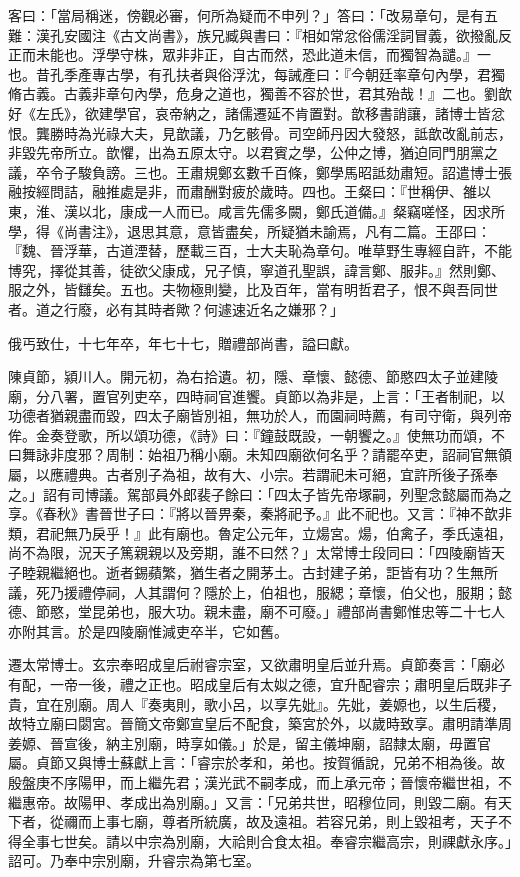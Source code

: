 \begin{pinyinscope}
 客曰：「當局稱迷，傍觀必審，何所為疑而不申列？」答曰：「改易章句，是有五難：漢孔安國注《古文尚書》，族兄臧與書曰：『相如常忿俗儒淫詞冒義，欲撥亂反正而未能也。浮學守株，眾非非正，自古而然，恐此道未信，而獨智為譴。』一也。昔孔季產專古學，有孔扶者與俗浮沈，每誡產曰：『今朝廷率章句內學，君獨脩古義。古義非章句內學，危身之道也，獨善不容於世，君其殆哉！』二也。劉歆好《左氏》，欲建學官，哀帝納之，諸儒遷延不肯置對。歆移書誚讓，諸博士皆忿恨。龔勝時為光祿大夫，見歆議，乃乞骸骨。司空師丹因大發怒，詆歆改亂前志，非毀先帝所立。歆懼，出為五原太守。以君賓之學，公仲之博，猶迫同門朋黨之議，卒令子駿負謗。三也。王肅規鄭玄數千百條，鄭學馬昭詆劾肅短。詔遣博士張融按經問詰，融推處是非，而肅酬對疲於歲時。四也。王粲曰：『世稱伊、雒以東，淮、漢以北，康成一人而已。咸言先儒多闕，鄭氏道備。』粲竊嗟怪，因求所學，得《尚書注》，退思其意，意皆盡矣，所疑猶未諭焉，凡有二篇。王邵曰：『魏、晉浮華，古道湮替，歷載三百，士大夫恥為章句。唯草野生專經自許，不能博究，擇從其善，徒欲父康成，兄子慎，寧道孔聖誤，諱言鄭、服非。』然則鄭、服之外，皆讎矣。五也。夫物極則變，比及百年，當有明哲君子，恨不與吾同世者。道之行廢，必有其時者歟？何遽速近名之嫌邪？」



 俄丐致仕，十七年卒，年七十七，贈禮部尚書，謚曰獻。



 陳貞節，潁川人。開元初，為右拾遺。初，隱、章懷、懿德、節愍四太子並建陵廟，分八署，置官列吏卒，四時祠官進饗。貞節以為非是，上言：「王者制祀，以功德者猶親盡而毀，四太子廟皆別祖，無功於人，而園祠時薦，有司守衛，與列帝侔。金奏登歌，所以頌功德，《詩》曰：『鐘鼓既設，一朝饗之。』使無功而頌，不曰舞詠非度邪？周制：始祖乃稱小廟。未知四廟欲何名乎？請罷卒吏，詔祠官無領屬，以應禮典。古者別子為祖，故有大、小宗。若謂祀未可絕，宜許所後子孫奉之。」詔有司博議。駕部員外郎裴子餘曰：「四太子皆先帝塚嗣，列聖念懿屬而為之享。《春秋》書晉世子曰：『將以晉畀秦，秦將祀予。』此不祀也。又言：『神不歆非類，君祀無乃戾乎！』此有廟也。魯定公元年，立煬宮。煬，伯禽子，季氏遠祖，尚不為限，況天子篤親親以及旁期，誰不曰然？」太常博士段同曰：「四陵廟皆天子睦親繼絕也。逝者錫蘋繁，猶生者之開茅土。古封建子弟，詎皆有功？生無所議，死乃援禮停祠，人其謂何？隱於上，伯祖也，服緦；章懷，伯父也，服期；懿德、節愍，堂昆弟也，服大功。親未盡，廟不可廢。」禮部尚書鄭惟忠等二十七人亦附其言。於是四陵廟惟減吏卒半，它如舊。



 遷太常博士。玄宗奉昭成皇后祔睿宗室，又欲肅明皇后並升焉。貞節奏言：「廟必有配，一帝一後，禮之正也。昭成皇后有太姒之德，宜升配睿宗；肅明皇后既非子貴，宜在別廟。周人『奏夷則，歌小呂，以享先妣』。先妣，姜嫄也，以生后稷，故特立廟曰閟宮。晉簡文帝鄭宣皇后不配食，築宮於外，以歲時致享。肅明請準周姜嫄、晉宣後，納主別廟，時享如儀。」於是，留主儀坤廟，詔隸太廟，毋置官屬。貞節又與博士蘇獻上言：「睿宗於孝和，弟也。按賀循說，兄弟不相為後。故殷盤庚不序陽甲，而上繼先君；漢光武不嗣孝成，而上承元帝；晉懷帝繼世祖，不繼惠帝。故陽甲、孝成出為別廟。」又言：「兄弟共世，昭穆位同，則毀二廟。有天下者，從禰而上事七廟，尊者所統廣，故及遠祖。若容兄弟，則上毀祖考，天子不得全事七世矣。請以中宗為別廟，大祫則合食太祖。奉睿宗繼高宗，則祼獻永序。」詔可。乃奉中宗別廟，升睿宗為第七室。




\end{pinyinscope}
